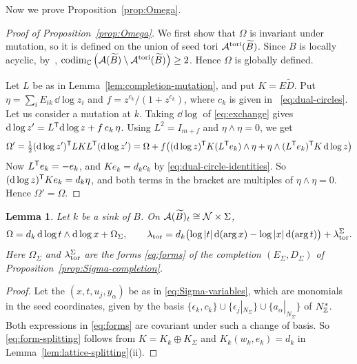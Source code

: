 \documentclass[12pt, letter]{amsart}
\newtheorem{lemma}[dummy]{Lemma}
\theoremstyle{definition}
\begin{document}
Now we prove Proposition~\ref{prop:Omega}. 
\begin{proof}[Proof of Proposition~\ref{prop:Omega}]
    We first show that \(\Omega\) is invariant under mutation, so it is defined on the union of seed tori \(\mathcal{A}^{\mathrm{tori}}(\widetilde B)\). Since \(B\) is locally acyclic, by~\cite[Proposition 7.6]{Lam-Speyer}, \(\operatorname{codim}_{\mathbb{C}} \left( \mathcal{A}(\widetilde B) \setminus \mathcal{A}^{\mathrm{tori}}(\widetilde B) \right) \ge 2\). Hence \(\Omega\) is globally defined.  
    
    Let $L$ be as in Lemma~\ref{lem:completion-mutation}, and put $K=E\widetilde D$.
    Put $\eta=\sum_iE_{ik}\,\dd\log z_i$ and $f=z^{c_k}/(1+z^{c_k})$, where \(c_k\) is given in ~\eqref{eq:dual-circles}. 
    Let us consider a mutation at \(k\). 
    Taking $\dd\log$ of \eqref{eq:exchange}  gives 
    $\mathrm{d}\log z'=L^{\mathsf T}\mathrm{d}\log z+f\,e_k\,\eta$.
    Using $L^2=I_{m+f}$ and $\eta\wedge\eta=0$, we get
    \[
    \Omega'=\tfrac12(\mathrm{d}\log z')^{\mathsf T}LKL^{\mathsf T}(\mathrm{d}\log z')
    =\Omega+f\big((\mathrm{d}\log z)^{\mathsf T}K(L^{\mathsf T}e_k)\wedge \eta+\eta\wedge(L^{\mathsf T}e_k)^{\mathsf T}K\, \mathrm{d} \log z\big)
    \]
    Now $L^{\mathsf T}e_k=-e_k$, and $K e_k=d_kc_k$ by \eqref{eq:dual-circle-identities}.
    So $(\mathrm{d}\log z)^{\mathsf T}Ke_k=d_k\eta$, and both terms in the bracket are multiples of $\eta\wedge\eta=0$.
    Hence $\Omega'=\Omega$.
    \end{proof}
    
\begin{lemma}\label{lem:form-invariance}
Let \(k\) be a sink of \(B\). On $\mathcal{A}(\widetilde B)_t\cong\mathcal{N}\times\Sigma$,
\begin{equation}\label{eq:form-splitting}
 \Omega=d_k\,\mathrm{d}\log t\wedge \mathrm{d}\log x+\Omega_\Sigma,\qquad
 \lambda_{\mathrm{tor}}=d_k\bigl(\log|t|\,\mathrm{d}(\arg x)-\log|x|\,\mathrm{d}(\arg t)\bigr)+\lambda_{\mathrm{tor}}^\Sigma .
\end{equation}
Here $\Omega_\Sigma$ and $\lambda_{\mathrm{tor}}^\Sigma$ are the forms \eqref{eq:forms} of the completion $(E_\Sigma,D_\Sigma)$ of Proposition~\ref{prop:Sigma-completion}.
\end{lemma}

\begin{proof}
Let the $(x,t,u_j,y_\alpha)$ be as in \eqref{eq:Sigma-variables}, which are monomials in the seed coordinates, given by the basis $\{\epsilon_k,c_k\}\cup\{\epsilon_j|_{N_\Sigma}\}\cup\{a_\alpha|_{N_\Sigma}\}$ of $N_{\mathbb{Z}}^*$.
Both expressions in \eqref{eq:forms} are covariant under such a change of basis.
So \eqref{eq:form-splitting} follows from $K=K_k\oplus K_\Sigma$ and $K_k(w_k,e_k)=d_k$ in Lemma~\ref{lem:lattice-splitting}(ii).
\end{proof}
\end{document}
